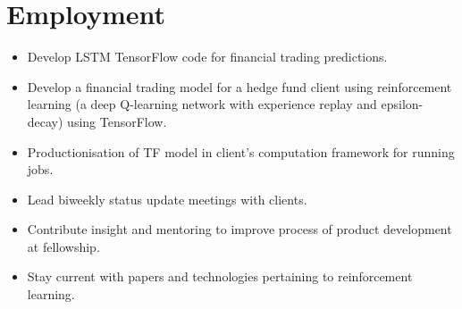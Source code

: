 \documentclass[11pt,a4paper,unicode]{moderncv}
\begin{document}
\vspace*{-6mm}
\maketitle
\vspace*{-6mm}

\section{Employment}


\vspace{-.1cm}
\cvline{}
{\begin{itemize} 
	  \item Develop LSTM TensorFlow code for financial trading predictions.
	  \item Develop a financial trading model for a hedge fund client using reinforcement learning (a deep Q-learning network with experience replay and epsilon-decay) using TensorFlow.
	  \item Productionisation of TF model in client's computation framework for running jobs.
	  \item Lead biweekly status update meetings with clients.
	  \item Contribute insight and mentoring to improve process of product development at fellowship.
	  \item Stay current with papers and technologies pertaining to reinforcement learning.
\end{itemize}}
\vspace{-.5cm}
\end{document}
